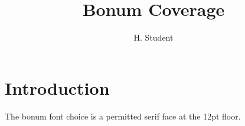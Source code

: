 \documentclass[phd,font=bonum,12pt,a4paper]{bangorthesis}
\title{Bonum Coverage}
\author{H. Student}
\begin{document}
\maketitle
\chapter{Introduction}
The bonum font choice is a permitted serif face at the 12pt floor.
\end{document}
